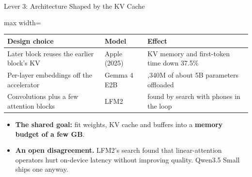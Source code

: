 \begin{frame}{Lever 3: Architecture Shaped by the KV Cache}
    \begin{center}
    \small
    \renewcommand{\arraystretch}{1.15}
    \begin{adjustbox}{max width=\linewidth}\begin{tabular}{>{\raggedright\arraybackslash}p{5.1cm}>{\raggedright\arraybackslash}p{2.1cm}>{\raggedright\arraybackslash}p{5.4cm}}
        \toprule
        \textbf{Design choice} & \textbf{Model} & \textbf{Effect} \\
        \midrule
        Later block reuses the earlier block's KV & Apple (2025) & KV memory and first-token time down 37.5\% \\
        Per-layer embeddings off the accelerator & Gemma 4 E2B & 2,340M of about 5B parameters offloaded \\
        Convolutions plus a few attention blocks & LFM2 & found by search with phones in the loop \\
        \bottomrule
    \end{tabular}\end{adjustbox}
    \end{center}
    \begin{itemize}\itemsep0.4em
        \item \textbf{The shared goal:} fit weights, KV cache and buffers into a \textbf{memory budget of a few GB}.
        \item \textbf{An open disagreement.} LFM2's search found that linear-attention operators hurt on-device latency without improving quality. Qwen3.5 Small ships one anyway.
    \end{itemize}
\end{frame}

